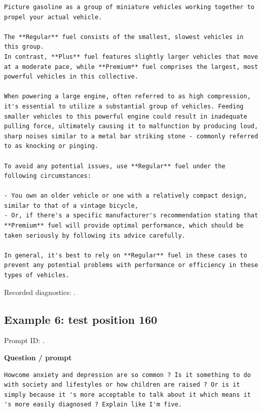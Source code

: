 \begin{Verbatim}
Picture gasoline as a group of miniature vehicles working together to propel your actual vehicle.

The **Regular** fuel consists of the smallest, slowest vehicles in this group.
In contrast, **Plus** fuel features slightly larger vehicles that move at a moderate pace, while **Premium** fuel comprises the largest, most powerful vehicles in this collective.

When powering a large engine, often referred to as high compression, it's essential to utilize a substantial group of vehicles. Feeding smaller vehicles to this powerful engine could result in inadequate pulling force, ultimately causing it to malfunction by producing loud, sharp noises similar to a metal bar striking stone - commonly referred to as knocking or pinging.

To avoid any potential issues, use **Regular** fuel under the following circumstances:

- You own an older vehicle or one with a relatively compact design, similar to that of a vintage bicycle, 
- Or, if there's a specific manufacturer's recommendation stating that **Premium** fuel will provide optimal performance, which should be taken seriously by following its advice carefully.

In general, it's best to rely on **Regular** fuel in these cases to prevent any potential problems with performance or efficiency in these types of vehicles.
\end{Verbatim}

Recorded diagnostics:
\texttt{}.

\subsection{Example 6: test position
160}\label{record-docs-watermarking-qualitative-text-latent-bira-md-example-6-test-position-160}

Prompt ID:
\texttt{}.

\textbf{Question / prompt}

\begin{Verbatim}
Howcome anxiety and depression are so common ? Is it something to do with society and lifestyles or how children are raised ? Or is it simply because it 's more acceptable to talk about it which means it 's more easily diagnosed ? Explain like I'm five.
\end{Verbatim}

